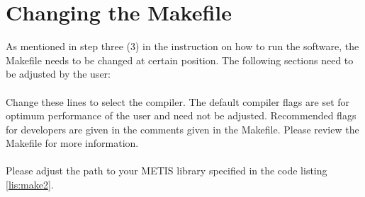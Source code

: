 \section{Changing the Makefile}
\label{subsec:changeMake}
    As mentioned in step three (3) in the instruction on how to run the software, the Makefile needs to be changed at certain position. The following sections need to be adjusted by the user: \\
     \\
    Change these lines to select the compiler. The default compiler flags are set for optimum performance of the user and need not be adjusted. Recommended flags for developers are given in the comments given in the Makefile. Please review the Makefile for more information.  \\  
    \\
    Please adjust the path to your METIS library specified in the code listing \ref{lis:make2}.
    
\newpage
